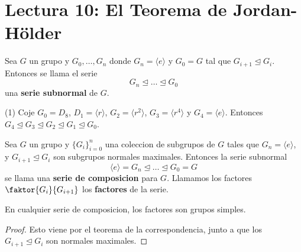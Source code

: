 \section*{Lectura 10: El Teorema de Jordan-H\"older}

\begin{definition}
    Sea $G$ un grupo y  $G_0, \dots, G_n$ donde $G_n=\langle e \rangle$ y
    $G_0=G$ tal que $G_{i+1} \unlhd G_i$. Entonces se llama el serie
    \begin{equation*}
        G_n \unlhd \dots \unlhd G_0
    \end{equation*}
    una \textbf{serie subnormal} de $G$.
\end{definition}

\begin{example}\label{}
    \item[(1)] Coje $G_0=D_8$, $D_1=\langle r \rangle$, $G_2=\langle r^2
        \rangle$, $G_3=\langle r^4 \rangle$ y $G_4=\langle e \rangle$. Entonces
        $G_4 \unlhd G_3 \unlhd G_2 \unlhd G_1 \unlhd G_0$.
\end{example}

\begin{definition}
    Sea $G$ un grupo y  $\{G_i\}_{i=0}^n$ una coleccion de subgrupos de $G$
    tales que $G_n=\langle e \rangle$, y $G_{i+1} \unlhd G_i$ son subgrupos
    normales maximales. Entonces la serie subnormal
    \begin{equation*}
        \langle e \rangle=G_n \unlhd \dots \unlhd G_0=G
    \end{equation*}
    se llama una \textbf{serie de composicion} para $G$. Llamamos los factores
    $\faktor{G_i}{G_{i+1}}$ los \textbf{factores} de la serie.
\end{definition}

\begin{lemma}\label{10.43}
    En cualquier serie de composicion, los factores son grupos simples.
\end{lemma}
\begin{proof}
    Esto viene por el teorema de la correspondencia, junto a que los $G_{i+1}
    \unlhd G_i$ son normales maximales.
\end{proof}

